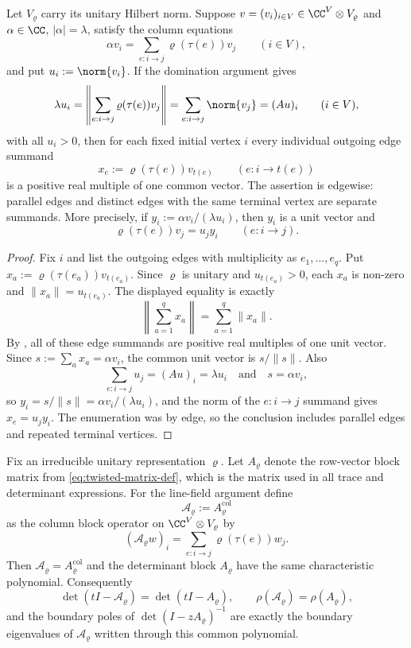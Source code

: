 \begin{lemma}
  \label{lem:edgewise-domination-equality}
  Let \(V_\varrho\) carry its unitary Hilbert norm.  Suppose
  \(v=(v_i)_{i\in V}\in\CC^V\otimes V_\varrho\) and
  \(\alpha\in\CC\), \(|\alpha|=\lambda\), satisfy the column equations
  \[
    \alpha v_i=\sum_{e:i\to j}\varrho(\tau(e))v_j
    \qquad(i\in V),
  \]
  and put \(u_i:=\norm{v_i}\).  If the domination argument gives
  \[
    \lambda u_i
    =
    \left\|\sum_{e:i\to j}\varrho(\tau(e))v_j\right\|
    =
    \sum_{e:i\to j}\norm{v_j}
    =
    (Au)_i
    \qquad(i\in V),
  \]
  with all \(u_i>0\), then for each fixed initial vertex \(i\) every
  individual outgoing edge summand
  \[
    x_e:=\varrho(\tau(e))v_{t(e)}
    \qquad(e:i\to t(e))
  \]
  is a positive real multiple of one common vector.  The assertion is
  edgewise: parallel edges and distinct edges with the same terminal vertex
  are separate summands.  More precisely, if
  \(y_i:=\alpha v_i/(\lambda u_i)\), then \(y_i\) is a unit vector and
  \[
    \varrho(\tau(e))v_j=u_j y_i
    \qquad(e:i\to j).
  \]
\end{lemma}

\begin{proof}
  Fix \(i\) and list the outgoing edges with multiplicity as
  \(e_1,\ldots,e_q\).  Put
  \(x_a:=\varrho(\tau(e_a))v_{t(e_a)}\).  Since \(\varrho\) is unitary and
  \(u_{t(e_a)}>0\), each \(x_a\) is non-zero and
  \(\|x_a\|=u_{t(e_a)}\).  The displayed equality is exactly
  \[
    \left\|\sum_{a=1}^q x_a\right\|=\sum_{a=1}^q\|x_a\|.
  \]
  By , all of these edge summands are
  positive real multiples of one unit vector.  Since
  \(s:=\sum_a x_a=\alpha v_i\), the common unit vector is \(s/\|s\|\).  Also
  \[
    \sum_{e:i\to j}u_j=(Au)_i=\lambda u_i
    \quad\text{and}\quad
    s=\alpha v_i,
  \]
  so
  \(y_i=s/\|s\|=\alpha v_i/(\lambda u_i)\), and the norm of the \(e:i\to j\)
  summand gives \(x_e=u_j y_i\).  The enumeration was by edge, so the
  conclusion includes parallel edges and repeated terminal vertices.
\end{proof}

\begin{lemma}
  \label{lem:eta-gap-column-determinant-convention}
  Fix an irreducible unitary representation \(\varrho\).  Let
  \(A_\varrho\) denote the row-vector block matrix from
  \eqref{eq:twisted-matrix-def}, which is the matrix used in all trace and
  determinant expressions.  For the line-field argument define
  \[
    \mathcal A_\varrho:=A_\varrho^{\mathrm{col}}
  \]
  as the column block operator on
  \(\CC^V\otimes V_\varrho\) by
  \[
    (\mathcal A_\varrho w)_i
    =
    \sum_{e:i\to j}\varrho(\tau(e))w_j .
  \]
  Then \(\mathcal A_\varrho=A_\varrho^{\mathrm{col}}\) and the determinant block
  \(A_\varrho\) have the same characteristic polynomial.  Consequently
  \[
    \det(tI-\mathcal A_\varrho)
    =
    \det(tI-A_\varrho),
    \qquad
    \rho(\mathcal A_\varrho)=\rho(A_\varrho),
  \]
  and the boundary poles of
  \(\det(I-zA_\varrho)^{-1}\) are exactly the boundary eigenvalues of
  \(\mathcal A_\varrho\) written through this common polynomial.
\end{lemma}

